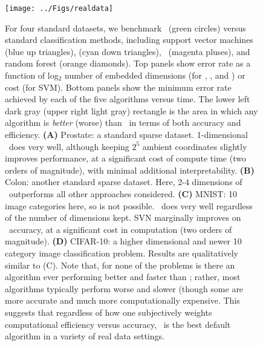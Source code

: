 \documentclass[10pt]{article}
\begin{document}
\begin{figure}
\centering
\texttt{[image: ../Figs/realdata]}
\caption{
For four standard datasets, we benchmark \Lol~(green circles) versus standard classification methods, including support vector machines (blue up triangles),  (cyan down triangles), ~(magenta pluses), and random forest (orange diamonds). 
Top panels show error rate as a function of log$_2$ number of embedded dimensions (for \Lol, , and ) or cost (for SVM).
Bottom panels show the minimum error rate achieved by each of the five algorithms versus time.
The lower left dark gray (upper right light gray) rectangle is the area in which any algorithm is \emph{better}  (worse) than \Lol~in terms of both accuracy and efficiency.
\textbf{(A)} Prostate: a standard sparse dataset.  1-dimensional \Lol~does very well, although keeping $2^5$ ambient coordinates slightly improves performance, at a significant cost of compute time (two orders of magnitude), with minimal additional interpretability.
\textbf{(B)} Colon: another standard sparse dataset.  Here, 2-4 dimensions of \Lol~outperforms all other approaches considered.
\textbf{(C)} MNIST: 10 image categories here, so  is not possible.  \Lol~does very well regardless of the number of dimensions kept.  SVN marginally improves on \Lol~accuracy, at a significant cost in computation (two orders of magnitude).
\textbf{(D)} CIFAR-10: a higher dimensional and newer 10 category image classification problem.  Results are qualitatively similar to (C).
% 
Note that, for none of the problems is there an algorithm ever performing better and faster than \Lol; rather, most algorithms typically perform worse and slower (though some are more accurate and much more computationally expensive. 
This suggests that regardless of how one subjectively weights computational efficiency versus accuracy, \Lol~is the best default algorithm in a variety of real data settings.
}
\label{f:realdata}
\end{figure}
\end{document}

